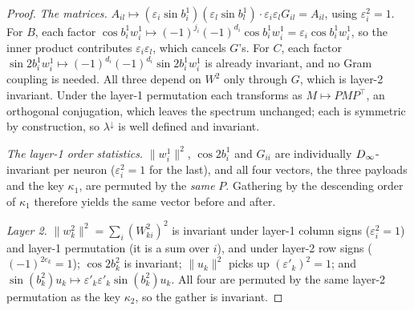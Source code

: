 \begin{proof}
\emph{The matrices.} $A_{il} \mapsto (\varepsilon_i\sin b^1_i)(\varepsilon_l \sin b^1_l)\cdot
\varepsilon_i\varepsilon_l G_{il} = A_{il}$, using $\varepsilon_i^2 = 1$. For $B$, each factor
$\cos b^1_i w^1_i \mapsto (-1)^{j_i}(-1)^{d_i}\cos b^1_i w^1_i = \varepsilon_i \cos b^1_i w^1_i$,
so the inner product contributes $\varepsilon_i\varepsilon_l$, which cancels $G$'s. For $C$, each
factor $\sin 2b^1_i w^1_i \mapsto (-1)^{d_i}(-1)^{d_i}\sin 2b^1_i w^1_i$ is already invariant, and
no Gram coupling is needed. All three depend on $W^2$ only through $G$, which is layer-2 invariant.
Under the layer-1 permutation each transforms as $M \mapsto PMP^\top$, an orthogonal conjugation,
which leaves the spectrum unchanged; each is symmetric by construction, so
$\lambda^{\downarrow}$ is well defined and invariant.

\emph{The layer-1 order statistics.} $\|w^1_i\|^2$, $\cos 2b^1_i$ and $G_{ii}$ are individually
$D_\infty$-invariant per neuron ($\varepsilon_i^2 = 1$ for the last), and all four vectors, the three payloads and the key $\kappa_1$, are permuted by the \emph{same} $P$. Gathering by the
descending order of $\kappa_1$ therefore yields the same vector before and after.

\emph{Layer 2.} $\|w^2_k\|^2 = \sum_i (W^2_{ki})^2$ is invariant under layer-1 column signs
($\varepsilon_i^2=1$) and layer-1 permutation (it is a sum over $i$), and under layer-2 row signs
($(-1)^{2e_k}=1$); $\cos 2b^2_k$ is invariant; $\|u_k\|^2$ picks up $(\varepsilon'_k)^2 = 1$; and
$\sin(b^2_k)u_k \mapsto \varepsilon'_k\varepsilon'_k \sin(b^2_k)u_k$. All four are permuted by the
same layer-2 permutation as the key $\kappa_2$, so the gather is invariant.
\end{proof}

